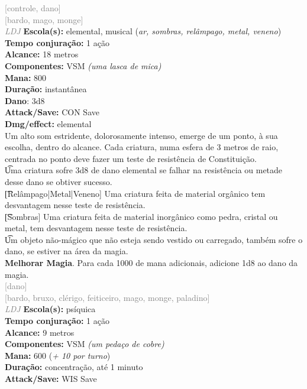 \documentclass{RPG_Adventure}[2021/10/20]
\begin{document}
{\scriptsize \textcolor{gray}{[controle, dano]\\}}
{\scriptsize \textcolor{gray}{[bardo, mago, monge]\\}}
{\tiny \textcolor{gray}{\textit{LDJ}}}
{\small \t \textbf{Escola(s):} elemental, musical (\textit{ar, sombras, relâmpago, metal, veneno})\\\t \textbf{Tempo conjuração:} 1 ação\\\t \textbf{Alcance:} 18 metros\\\t \textbf{Componentes:} VSM \textit{(uma lasca de mica)}\\\t \textbf{Mana:} 800\\\t \textbf{Duração:} instantânea\\\t \textbf{Dano}: 3d8\\\t \textbf{Attack/Save:} CON Save\\\t \textbf{Dmg/effect:} elemental\\}
{\normalsize Um alto som estridente, dolorosamente intenso, emerge de um ponto, à sua escolha, dentro do alcance. Cada criatura, numa esfera de 3 metros de raio, centrada no ponto deve fazer um teste de resistência de Constituição.\\\t Uma criatura sofre 3d8 de dano elemental se falhar na resistência ou metade desse dano se obtiver sucesso.\\\t [Relâmpago|Metal|Veneno] Uma criatura feita de material orgânico tem desvantagem nesse teste de resistência.\\\t [Sombras] Uma criatura feita de material inorgânico como pedra, cristal ou metal, tem desvantagem nesse teste de resistência.\\\t Um objeto não-mágico que não esteja sendo vestido ou carregado, também sofre o dano, se estiver na área da magia.\\\t \textbf{Melhorar Magia}. Para cada 1000 de mana adicionais, adicione 1d8 ao dano da magia.\\}
{\scriptsize \textcolor{gray}{[dano]\\}}
{\scriptsize \textcolor{gray}{[bardo, bruxo, clérigo, feiticeiro, mago, monge, paladino]\\}}
{\tiny \textcolor{gray}{\textit{LDJ}}}
{\small \t \textbf{Escola(s):} psíquica\\\t \textbf{Tempo conjuração:} 1 ação\\\t \textbf{Alcance:} 9 metros\\\t \textbf{Componentes:} VSM \textit{(um pedaço de cobre)}\\\t \textbf{Mana:} 600 (\textit{+ 10 por turno})\\\t \textbf{Duração:} concentração, até 1 minuto\\\t \textbf{Attack/Save:} WIS Save\\}
\end{document}
